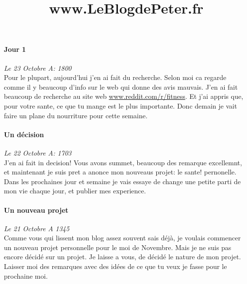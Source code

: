 \documentclass{article}
\begin{document}
\title{www.LeBlogdePeter.fr}

\paragraph{Jour 1} \emph{Le 23 Octobre A: 1800}\\
Pour le plupart, aujourd'hui j'en ai fait du recherche. Selon moi ca regarde comme il y beaucoup d'info sur le web qui donne des avis mauvais.
J'en ai fait beaucoup de recherche au site web \underline{www.reddit.com/r/fitness}. Et j'ai appris que, pour votre sante, ce que tu mange est
le plus importante. Donc demain je vait faire un plane du nourriture pour cette semaine.

\paragraph{Un décision} \emph{Le 22 Octobre A: 1703}\\
J'en ai fait in decision!  Vous avons summet, beaucoup des remarque excellemnt, et maintenant je suis pret a anonce mon nouveaus projet: le sante!  pernonelle. Dans les prochaines jour et semaine je vais essaye de change une petite parti de mon vie chaque jour, et publier mes experience.

\paragraph{Un nouveau projet} \emph{Le 21 Octobre A 1345} \\
Comme vous qui lissent mon blog assez souvent sais déjà, je voulais commencer un nouveau projet personnelle pour le moi de Novembre. Mais je ne suis pas encore décidé sur un projet. Je laisse a vous, de décidé le nature de mon projet. Laisser moi des remarques avec des idées de ce que tu veux je fasse pour le prochaine moi.
\end{document}
